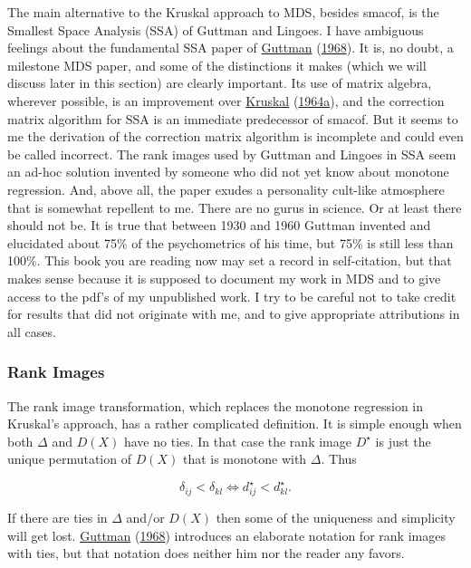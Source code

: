 \documentclass[
  12pt,
]{book}
\theoremstyle{definition}
\theoremstyle{definition}
\theoremstyle{definition}
\theoremstyle{definition}
\theoremstyle{remark}
\begin{document}
The main alternative to the Kruskal approach to MDS, besides smacof, is
the Smallest Space Analysis (SSA) of Guttman and Lingoes. I have ambiguous feelings about the fundamental SSA paper of \protect\hyperlink{ref-guttman_68}{Guttman} (\protect\hyperlink{ref-guttman_68}{1968}). It is, no doubt, a milestone MDS paper, and some of the distinctions it makes (which we will discuss later in this section) are clearly important. Its use of matrix algebra, wherever possible, is an improvement over \protect\hyperlink{ref-kruskal_64a}{Kruskal} (\protect\hyperlink{ref-kruskal_64a}{1964a}), and the correction matrix algorithm for SSA is an immediate predecessor of smacof. But it seems to me the derivation of the correction matrix algorithm is incomplete and could even be called incorrect. The rank images used by Guttman and Lingoes in SSA seem an ad-hoc solution invented by someone who did not yet know about monotone regression. And, above all, the paper exudes a personality cult-like atmosphere that is somewhat repellent to me. There are no gurus in science. Or at least there should not be. It is true that between 1930 and 1960 Guttman invented and elucidated about 75\% of the psychometrics of his time, but 75\% is still less than 100\%. This book you are reading now may set a record in self-citation, but that makes sense because it is supposed to document my work in MDS and to give access to the pdf's of my unpublished work. I try to be careful not to take credit for results that did not originate with me, and to give appropriate attributions in all cases.

\hypertarget{rank-images}{%
\subsubsection{Rank Images}\label{rank-images}}

The rank image transformation, which replaces the monotone regression in Kruskal's approach, has a rather complicated definition. It is simple enough when both \(\Delta\) and \(D(X)\) have no ties. In that case
the rank image \(D^\star\) is just the unique permutation of \(D(X)\) that is monotone with \(\Delta\). Thus

\begin{equation}
\delta_{ij}<\delta_{kl}\Leftrightarrow d_{ij}^\star<d_{kl}^\star.
\label{eq:nmrankimage0}
\end{equation}

If there are ties in \(\Delta\) and/or \(D(X)\) then some of the uniqueness and simplicity will get lost. \protect\hyperlink{ref-guttman_68}{Guttman} (\protect\hyperlink{ref-guttman_68}{1968}) introduces an elaborate notation for rank images with ties, but that notation does neither him nor the reader any favors.
\end{document}
